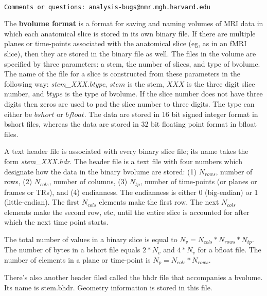 \documentclass[10pt]{article}
\begin{document}
\begin{Large}
 \\
\end{Large}

\noindent 
\begin{verbatim}
Comments or questions: analysis-bugs@nmr.mgh.harvard.edu
\end{verbatim}

The {\bf bvolume format} is a format for saving and naming volumes of
MRI data in which each anatomical slice is stored in its own binary
file.  If there are multiple planes or time-points associated with the
anatomical slice (eg, as in an fMRI slice), then they are stored in
the binary file as well.  The files in the volume are specified by
three parameters: a stem, the number of slices, and type of bvolume.
The name of the file for a slice is constructed from these parameters
in the following way: {\em stem\_XXX.btype}, $stem$ is the stem, $XXX$
is the three digit slice number, and $btype$ is the type of bvolume.
If the slice number does not have three digits then zeros are used to
pad the slice number to three digits.  The type can either be $bshort$
or $bfloat$.  The data are stored in 16 bit signed integer format in
bshort files, whereas the data are stored in 32 bit floating point
format in bfloat files.

A text header file is associated with every binary slice file; its
name takes the form {\em stem\_XXX.hdr}.  The header file is a text
file with four numbers which designate how the data in the binary
bvolume are stored: (1) $N_{rows}$, number of rows, (2) $N_{cols}$,
number of columns, (3) $N_{tp}$, number of time-points (or planes or
frames or TRs), and (4) endianness.  The endianness is either 0
(big-endian) or 1 (little-endian).  The first $N_{cols}$ elements make
the first row.  The next $N_{cols}$ elements make the second row, etc,
until the entire slice is accounted for after which the next time
point starts.

The total number of values in a binary slice is equal to $N_v = N_{cols} *
N_{rows} * N_{tp}$.  The number of bytes in a bshort file equals
$2*N_v$ and $4*N_v$ for a bfloat file.  The number of elements in a
plane or time-point is $N_p = N_{cols} * N_{rows}$.  

There's also another header filed called the bhdr file that
accompanies a bvolume. Its name is stem.bhdr. Geometry information is
stored in this file.
\end{document}
